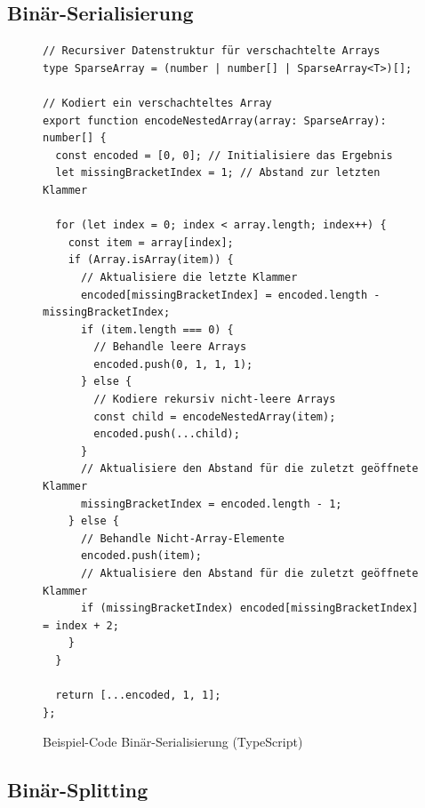 \documentclass[ngerman]{article}
\begin{document}
\subsection{Binär-Serialisierung}
\label{sec:code_nested_encoding}

\begin{figure}[htbp]
  \begin{code}
    \begin{verbatim}
// Recursiver Datenstruktur für verschachtelte Arrays
type SparseArray = (number | number[] | SparseArray<T>)[];

// Kodiert ein verschachteltes Array
export function encodeNestedArray(array: SparseArray): number[] {
  const encoded = [0, 0]; // Initialisiere das Ergebnis
  let missingBracketIndex = 1; // Abstand zur letzten Klammer

  for (let index = 0; index < array.length; index++) {
    const item = array[index];
    if (Array.isArray(item)) {
      // Aktualisiere die letzte Klammer
      encoded[missingBracketIndex] = encoded.length - missingBracketIndex;
      if (item.length === 0) {
        // Behandle leere Arrays
        encoded.push(0, 1, 1, 1);
      } else {
        // Kodiere rekursiv nicht-leere Arrays
        const child = encodeNestedArray(item);
        encoded.push(...child);
      }
      // Aktualisiere den Abstand für die zuletzt geöffnete Klammer
      missingBracketIndex = encoded.length - 1;
    } else {
      // Behandle Nicht-Array-Elemente
      encoded.push(item);
      // Aktualisiere den Abstand für die zuletzt geöffnete Klammer
      if (missingBracketIndex) encoded[missingBracketIndex] = index + 2;
    }
  }

  return [...encoded, 1, 1];
};
    \end{verbatim}
  \end{code}

  \caption{Beispiel-Code Binär-Serialisierung (TypeScript)}
  \label{sec:data_nested_encoding}

\end{figure}

\pagebreak

\subsection{Binär-Splitting}
\label{sec:code_nested_splitting}
\end{document}

